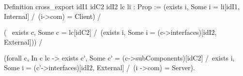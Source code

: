 Definition cross_export idI1 idC2 idI2 lc li : Prop :=
 (exists i, Some i = li[idI1, Internal] /\ (i->com) = Client) /\
 
 (~ exists c, Some c = lc[idC2] /\ 
    (exists i, Some i = (c->interfaces)[idI2, External])) /\
 
 (forall c, In c lc -> 
    exists c', Some c' = (c->subComponents)[idC2] /\
    exists i, Some i = (c'->interfaces)[idI2, External] /\
              (i ->com) = Server).